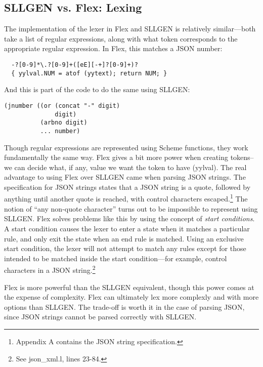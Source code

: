 \documentclass[12pt]{article}
\begin{document}
\subsection{SLLGEN vs. Flex: Lexing}
The implementation of the lexer in Flex and SLLGEN is relatively
similar---both take a list of regular expressions, along with what
token corresponds to the appropriate regular expression.
In Flex, this matches a JSON number:
\begin{lstlisting}
  -?[0-9]*\.?[0-9]+([eE][-+]?[0-9]+)?
  { yylval.NUM = atof (yytext); return NUM; }
\end{lstlisting}
And this is part of the code to do the same using SLLGEN:
\begin{lstlisting}
(jnumber ((or (concat "-" digit)
              digit)
          (arbno digit)
          ... number)
\end{lstlisting}
\par
Though regular expressions are represented using Scheme functions,
they work fundamentally the same way.  Flex gives a bit more power
when creating tokens--we can decide what, if any, value we want the
token to have (yylval).  The real advantage to using Flex over SLLGEN
came when parsing JSON strings.  The specification for JSON strings
states that a JSON string is a quote, followed by anything until
another quote is reached, with control characters
escaped.\footnote{Appendix A contains the JSON string specification.}
The notion of ``any non-quote character'' turns out to be impossible
to represent using SLLGEN.  Flex solves problems like this by using
the concept of \textit{start conditions}.\cite[10]{flex}  A start condition causes
the lexer to enter a state when it matches a particular rule, and only
exit the state when an end rule is matched.  Using an exclusive start
condition, the lexer will not attempt to match any rules except for
those intended to be matched inside the start condition---for example,
control characters in a JSON string.\footnote{See json\_xml.l, lines
  23-84.}\par
Flex is more powerful than the SLLGEN equivalent, though this power
comes at the expense of complexity.  Flex can ultimately lex more
complexly and with more options than SLLGEN.  The trade-off is worth
it in the case of parsing JSON, since JSON strings cannot be parsed
correctly with SLLGEN.
\end{document}
